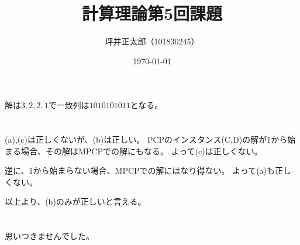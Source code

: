 \documentclass[a4paper,10pt]{jsarticle}
\begin{document}
\title{計算理論第5回課題}
\author{坪井正太郎（101830245）}
\date{\today}
\maketitle
\section{}
解は$3,2,2,1$で一致列は$1010101011$となる。

\section{}
(a),(c)は正しくないが、(b)は正しい。
PCPのインスタンス(C,D)の解が1から始まる場合、その解はMPCPでの解にもなる。
よって(c)は正しくない。

逆に、1から始まらない場合、MPCPでの解にはなり得ない。
よって(a)も正しくない。

以上より、(b)のみが正しいと言える。

\section{}
思いつきませんでした。
\end{document}
